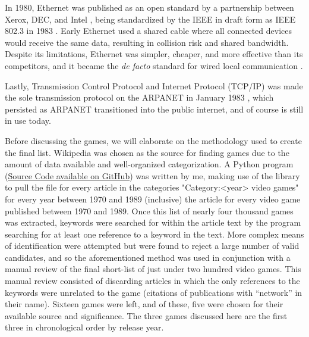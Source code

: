In 1980, Ethernet was published as an open standard by a partnership between Xerox, DEC, and Intel \cite{DIX} , being standardized by the IEEE in draft form as IEEE 802.3 in 1983 \cite{IEEE8023}. Early Ethernet used a shared cable where all connected devices would receive the same data, resulting in collision risk and shared bandwidth. Despite its limitations, Ethernet was simpler, cheaper, and more effective than its competitors, and it became the \textit{de facto} standard for wired local communication \cite{metcalfe}.

Lastly, Transmission Control Protocol and Internet Protocol (TCP/IP) was made the sole transmission protocol on the ARPANET in January 1983 \cite{flagday}, which persisted as ARPANET transitioned into the public internet, and of course is still in use today.

Before discussing the games, we will elaborate on the methodology used to create the final list. Wikipedia was chosen as the source for finding games due to the amount of data available and well-organized categorization. A Python program (\href{https://github.com/Anidion/wikipedia-scraper}{Source Code available on GitHub}) was written by me, making use of the  library \cite{pywikibot} to pull the  file for every article in the categories "Category:<year> video games" for every year between 1970 and 1989 (inclusive) \ie the article for every video game published between 1970 and 1989. Once this list of nearly four thousand games was extracted, keywords were searched for within the article text by the program searching for at least one reference to a keyword in the text. More complex means of identification were attempted but were found to reject a large number of valid candidates, and so the aforementioned method was used in conjunction with a manual review of the final short-list of just under two hundred video games. This manual review consisted of discarding articles in which the only references to the keywords were unrelated to the game (\eg citations of publications with ``network'' in their name). Sixteen games were left, and of these, five were chosen for their available source and significance. The three games discussed here are the first three in chronological order by release year.